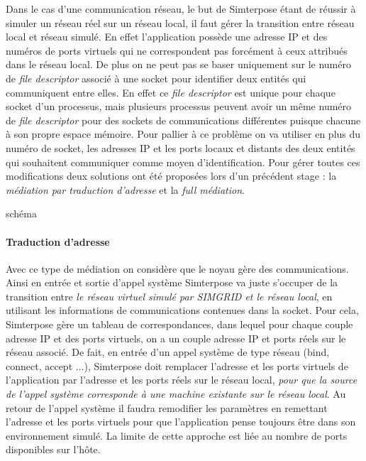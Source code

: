 Dans le cas d'une communication réseau, le but de Simterpose étant de réussir à
simuler un réseau réel sur un réseau local, il faut gérer la transition entre
réseau local et réseau simulé. En effet l'application possède une adresse IP et
des numéros de ports virtuels qui ne correspondent pas forcément à ceux
attribués dans le réseau local. De plus on ne peut pas se baser uniquement sur
le numéro de \textit{file descriptor} associé à une socket pour identifier deux
entités qui communiquent entre elles. En effet ce \textit{file descriptor} est
unique pour chaque socket d'un processus, mais plusieurs processus peuvent avoir
un même numéro de \textit{file descriptor} pour des sockets de communications
différentes puisque chacune à son propre espace mémoire. Pour pallier à ce
problème on va utiliser en plus du numéro de socket, les adresses IP et les
ports locaux et distants des deux entités qui souhaitent communiquer comme moyen
d'identification. Pour gérer toutes ces modifications deux solutions ont été
proposées lors d'un précédent stage
\cite{interception:GUILLAUME:interception_syscall}: la \textit{médiation par
  traduction d'adresse} et la \textit{full médiation}.

{\color{red}schéma}
\paragraph{Traduction d'adresse}
 Avec ce type de médiation on considère que le noyau gère des
 communications. Ainsi en entrée et sortie d'appel système Simterpose va juste
 s'occuper de la transition entre \textit{le réseau virtuel simulé par SIMGRID
   et le réseau local}, en utilisant les informations de communications
 contenues dans la socket. Pour cela, Simterpose gère un tableau de
 correspondances, dans lequel pour chaque couple adresse IP et des ports
 virtuels, on a un couple adresse IP et ports réels sur le réseau associé.  De
 fait, en entrée d'un appel système de type réseau (bind, connect, accept ...),
 Simterpose doit remplacer l'adresse et les ports virtuels de l'application par
 l'adresse et les ports réels sur le réseau local, \textit{pour que la source de
   l'appel système corresponde à une machine existante sur le réseau local}. Au
 retour de l'appel système il faudra remodifier les paramètres en remettant
 l'adresse et les ports virtuels pour que l'application pense toujours être dans
 son environnement simulé.  La limite de cette approche est liée au nombre de
 ports disponibles sur l'hôte.

